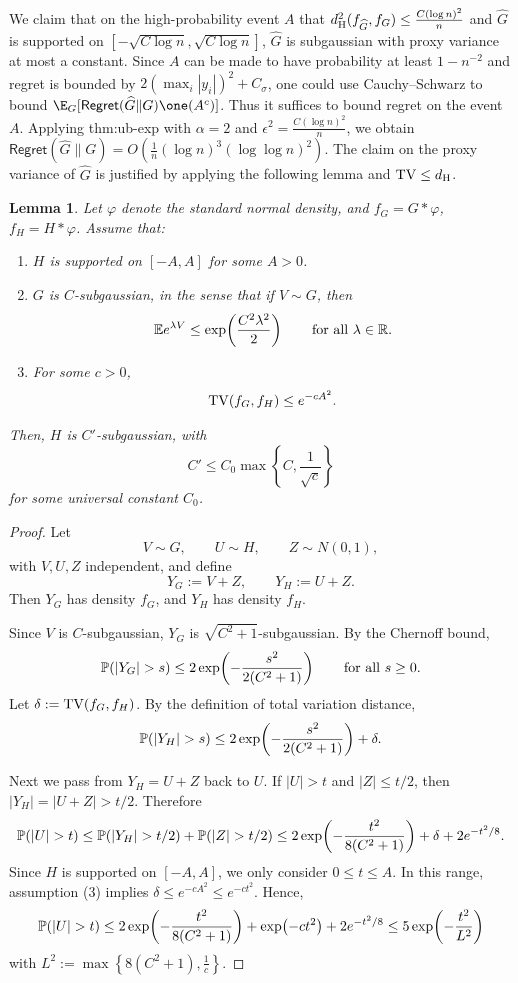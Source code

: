 \documentclass[letterpaper,11pt]{article}
\def\exp{\mathop{\rm exp}}
\newcommand{\TV}{{\rm TV}}
\newcommand{\hellinger}{d_{\rm H}}
\newtheorem{lemma}[theorem]{Lemma}
\theoremstyle{definition}
\newcommand{\Regret}{\mathsf{Regret}}
\renewcommand{\hat}{\widehat}
\begin{document}
We claim that on the high-probability event $A$ that $\hellinger^2(f_{\hat G},f_G) \leq
\frac{C(\log n)^2}{n}$ and $\hat G$ is supported on $[-\sqrt{C\log n},\sqrt{C\log n}]$, $\hat
 G$ is subgaussian with proxy variance at most a constant. Since $A$ can be made to have
 probability at least $1-n^{-2}$ and regret is bounded by $2(\max_i |y_i|)^2 + C_\sigma$,
 one could use Cauchy--Schwarz to bound $\E_G[\Regret(\hat G \Vert G) \one(A^c)]$. Thus
 it suffices to bound regret on the event $A$.
  Applying \prettyref
 {thm:ub-exp} with $\alpha=2$ and $\epsilon^2 = \frac{C(\log n)^2}{n}$, we obtain
 $\Regret(\hat G\|G) = O(\frac{1}{n} (\log n)^3 (\log \log n)^2)$.
 The claim on the proxy variance of $\hat G$ is justified by applying the following lemma
 and $\TV \leq \hellinger$. 

\begin{lemma}
\label{lem:tv-subgaussian-transfer}
Let $\varphi$ denote the standard normal density, and $
f_G = G * \varphi$, $f_H = H * \varphi$.
Assume that:
\begin{enumerate}
    \item $H$ is supported on $[-A,A]$ for some $A>0$.
    \item $G$ is $C$-subgaussian, in the sense that if $V \sim G$, then
    \[
    \mathbb E e^{\lambda V}
    \le
    \exp\!\left(\frac{C^2\lambda^2}{2}\right)
    \qquad
    \text{for all } \lambda \in \mathbb R.
    \]
    \item For some $c>0$,
    \[
    \TV(f_G,f_H)\le e^{-cA^2}.
    \]
\end{enumerate}
Then,
$H$ is $C'$-subgaussian, with
\[
C' \le C_0 \max\!\left\{C,\frac{1}{\sqrt c}\right\}
\]
for some universal constant $C_0$.
\end{lemma}

\begin{proof}
Let
\[
V \sim G,
\qquad
U \sim H,
\qquad
Z \sim N(0,1),
\]
with $V,U,Z$ independent, and define
\[
Y_G := V+Z,
\qquad
Y_H := U+Z.
\]
Then $Y_G$ has density $f_G$, and $Y_H$ has density $f_H$.

Since $V$ is $C$-subgaussian,
$Y_G$ is $\sqrt{C^2+1}$-subgaussian. By the Chernoff bound,
\[
\mathbb P(|Y_G|>s)
\le
2\exp\!\left(-\frac{s^2}{2(C^2+1)}\right)
\qquad
\text{for all } s\ge 0.
\]
Let $\delta := \TV(f_G,f_H)$. By the definition of total variation distance,
\[
\mathbb P(|Y_H|>s)
\le
2\exp\!\left(-\frac{s^2}{2(C^2+1)}\right)+\delta.
\]

Next we pass from $Y_H=U+Z$ back to $U$. If $|U|>t$ and $|Z|\le t/2$, then $
|Y_H| = |U+Z| > t/2$. Therefore
\[
\mathbb P(|U|>t)
\le
\mathbb P(|Y_H|>t/2)+\mathbb P(|Z|>t/2)
\le
2\exp\!\left(-\frac{t^2}{8(C^2+1)}\right)
+
\delta
+
2e^{-t^2/8}.
\]
Since $H$ is supported on $[-A,A]$, we only consider $0\le t\le A$. In this range, assumption (3) implies
$\delta
\le
e^{-cA^2}
\le
e^{-ct^2}$.
Hence,
\[
\mathbb P(|U|>t)
\le
2\exp\!\left(-\frac{t^2}{8(C^2+1)}\right)
+
\exp\!\left(-ct^2\right)
+
2e^{-t^2/8}
\leq 5\exp\!\left(-\frac{t^2}{L^2}\right)
\]
with $L^2 := \max\!\left\{8(C^2+1), \frac{1}{c}\right\}$.
\end{proof}
\end{document}
